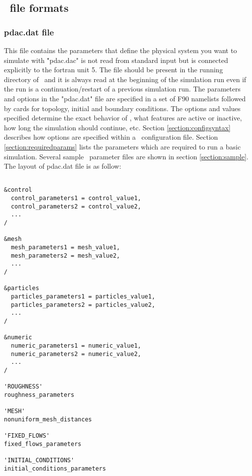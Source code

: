 \subsection{\PDAC\ file formats}
\label{section:formats}

\subsubsection{pdac.dat file}
\label{section:padc_dat}

This file contains the parameters that define the physical system
you want to simulate with \PDAC\. "pdac.dac" is not read from standard 
input but is connected explicitly to the fortran unit 5. The file should
be present in the running directory of \PDAC\, and it is always read
at the beginning of the simulation run even if the run is a 
continuation/restart of a previous simulation run. 
The parameters and options in the "pdac.dat" file are specified
in a set of F90 namelists followed by cards for topology, initial and boundary
conditions.
The options and values specified determine the exact behavior of
\PDAC, what features are active or inactive, how long the simulation
should continue, etc.  Section \ref{section:configsyntax} describes how
options are specified within a \PDAC\ configuration file.  Section
\ref{section:requiredparams} lists the parameters which are required
to run a basic simulation.
Several sample \PDAC\ parameter files are shown in section \ref{section:sample}.
The layout of pdac.dat file is as follow:

\begin{verbatim}

&control
  control_parameters1 = control_value1,
  control_parameters2 = control_value2,
  ...
/

&mesh
  mesh_parameters1 = mesh_value1,
  mesh_parameters2 = mesh_value2,
  ...
/

&particles
  particles_parameters1 = particles_value1,
  particles_parameters2 = particles_value2,
  ...
/

&numeric
  numeric_parameters1 = numeric_value1,
  numeric_parameters2 = numeric_value2,
  ...
/

'ROUGHNESS'
roughness_parameters

'MESH'
nonuniform_mesh_distances

'FIXED_FLOWS'
fixed_flows_parameters

'INITIAL_CONDITIONS'
initial_conditions_parameters

\end{verbatim}

